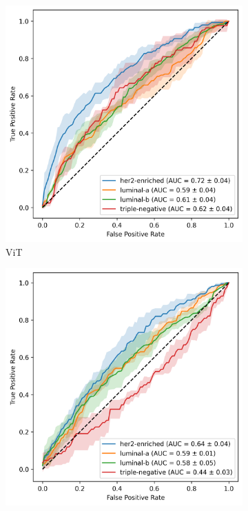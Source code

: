 \documentclass[a4paper,10pt]{book}
\begin{document}
\begin{figure}[h!]
    \centering
    \begin{subfigure}[t]{0.48\textwidth}
        \centering
        \includegraphics[width=\textwidth]{reports/assets/MEAN_AUC_Vit.png}
        \caption{ViT}
        \label{fig:mean_auc_vit}
    \end{subfigure}
    \begin{subfigure}[t]{0.48\textwidth}
        \centering
        \includegraphics[width=\textwidth]{reports/assets/MEAN_AUC_ResNet.png}

\end{subfigure}
\end{figure}
\end{document}
